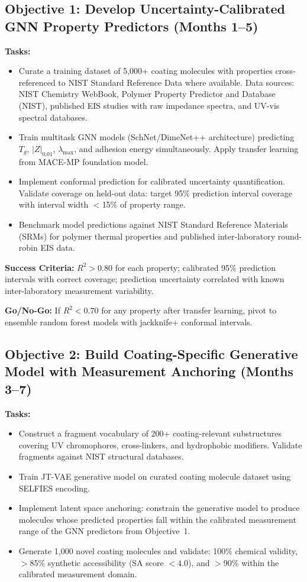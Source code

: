 \documentclass[11pt,letterpaper]{article}
\begin{document}
\subsection{Objective 1: Develop Uncertainty-Calibrated GNN Property Predictors (Months 1--5)}

\textbf{Tasks:}
\begin{itemize}[leftmargin=*]
  \item Curate a training dataset of 5,000+ coating molecules with properties cross-referenced to NIST Standard Reference Data where available. Data sources: NIST Chemistry WebBook, Polymer Property Predictor and Database (NIST), published EIS studies with raw impedance spectra, and UV-vis spectral databases.
  \item Train multitask GNN models (SchNet/DimeNet++ architecture) predicting $T_g$, $|Z|_{0.01}$, $\lambda_{\max}$, and adhesion energy simultaneously. Apply transfer learning from MACE-MP foundation model.
  \item Implement conformal prediction for calibrated uncertainty quantification. Validate coverage on held-out data: target 95\% prediction interval coverage with interval width $<$15\% of property range.
  \item Benchmark model predictions against NIST Standard Reference Materials (SRMs) for polymer thermal properties and published inter-laboratory round-robin EIS data.
\end{itemize}

\textbf{Success Criteria:} $R^2 > 0.80$ for each property; calibrated 95\% prediction intervals with correct coverage; prediction uncertainty correlated with known inter-laboratory measurement variability.

\textbf{Go/No-Go:} If $R^2 < 0.70$ for any property after transfer learning, pivot to ensemble random forest models with jackknife+ conformal intervals.

\subsection{Objective 2: Build Coating-Specific Generative Model with Measurement Anchoring (Months 3--7)}

\textbf{Tasks:}
\begin{itemize}[leftmargin=*]
  \item Construct a fragment vocabulary of 200+ coating-relevant substructures covering UV chromophores, cross-linkers, and hydrophobic modifiers. Validate fragments against NIST structural databases.
  \item Train JT-VAE generative model on curated coating molecule dataset using SELFIES encoding.
  \item Implement latent space anchoring: constrain the generative model to produce molecules whose predicted properties fall within the calibrated measurement range of the GNN predictors from Objective~1.
  \item Generate 1,000 novel coating molecules and validate: 100\% chemical validity, $>$85\% synthetic accessibility (SA score $< 4.0$), and $>$90\% within the calibrated measurement domain.
\end{itemize}
\end{document}
